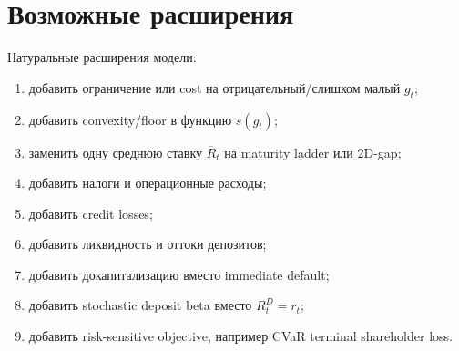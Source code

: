 \documentclass[11pt,a4paper]{article}
\newcommand{\1}{\mathbf{1}}
\begin{document}
\section{Возможные расширения}

Натуральные расширения модели:
\begin{enumerate}[noitemsep]
    \item добавить ограничение или cost на отрицательный/слишком малый $g_t$;
    \item добавить convexity/floor в функцию $s(g_t)$;
    \item заменить одну среднюю ставку $\overline{R}_t$ на maturity ladder или 2D-gap;
    \item добавить налоги и операционные расходы;
    \item добавить credit losses;
    \item добавить ликвидность и оттоки депозитов;
    \item добавить докапитализацию вместо immediate default;
    \item добавить stochastic deposit beta вместо $R_t^D=r_t$;
    \item добавить risk-sensitive objective, например CVaR terminal shareholder loss.
\end{enumerate}
\end{document}
